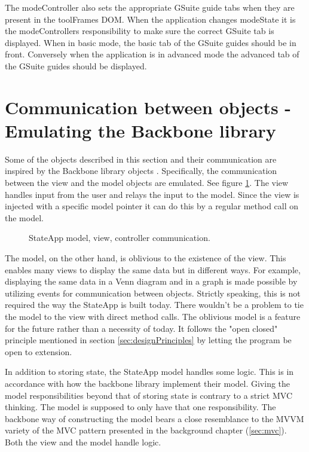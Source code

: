 \documentclass[english]{ifimaster}
\begin{document}
The modeController also sets the appropriate GSuite guide tabs when they are present in the toolFrames DOM. When the application changes modeState it is the modeControllers responsibility to make sure the correct GSuite tab is displayed. When in basic mode, the basic tab of the GSuite guides should be in front. Conversely when the application is in advanced mode the advanced tab of the GSuite guides should be displayed.


\section{Communication between objects - Emulating the Backbone library}
Some of the objects described in this section and their communication are inspired by the Backbone library objects \parencite{backbone}. Specifically, the communication between the view and the model objects are emulated. See figure \ref{fig:modelView}. The view handles input from the user and relays the input to the model. Since the view is injected with a specific model pointer it can do this by a regular method call on the model. 

\begin{figure}
\centering

\caption{StateApp model, view, controller communication.} \label{fig:modelView}

\end{figure}

The model, on the other hand, is oblivious to the existence of the view. This enables many views to display the same data but in different ways. For example, displaying the same data in a Venn diagram and in a graph is made possible by utilizing events for communication between objects. Strictly speaking, this is not required the way the StateApp is built today. There wouldn't be a problem to tie the model to the view with direct method calls. The oblivious model is a feature for the future rather than a necessity of today. It follows the "open closed" principle mentioned in section \ref{sec:designPrinciples} by letting the program be open to extension.


In addition to storing state, the StateApp model handles some logic. This is in accordance with how the backbone library implement their model. Giving the model responsibilities beyond that of storing state is contrary to a strict MVC thinking. The model is supposed to only have that one responsibility. The backbone way of constructing the model bears a close resemblance to the MVVM variety of the MVC pattern presented in the background chapter (\ref{sec:mvc}). Both the view and the model handle logic. 
\end{document}
